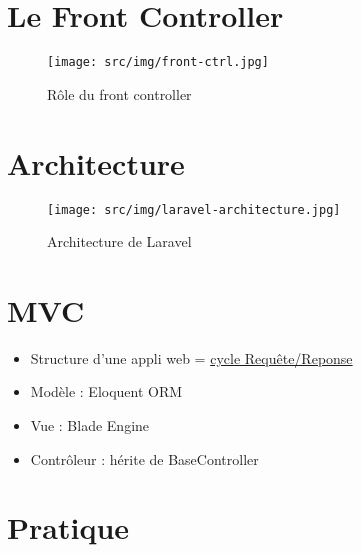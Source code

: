 \hypertarget{le-front-controller}{%
\section{Le Front Controller}\label{le-front-controller}}

\begin{figure}
\centering
\texttt{[image: src/img/front-ctrl.jpg]}
\caption{Rôle du front controller}
\end{figure}

\hypertarget{architecture}{%
\section{Architecture}\label{architecture}}

\begin{figure}
\centering
\texttt{[image: src/img/laravel-architecture.jpg]}
\caption{Architecture de Laravel}
\end{figure}

\hypertarget{mvc}{%
\section{MVC}\label{mvc}}

\begin{itemize}
\tightlist
\item
  Structure d'une appli web =
  \href{https://laravel.com/docs/master/lifecycle}{cycle
  Requête/Reponse}
\item
  Modèle : Eloquent ORM
\item
  Vue : Blade Engine
\item
  Contrôleur : hérite de BaseController
\end{itemize}

\hypertarget{pratique}{%
\section{Pratique}\label{pratique}}

